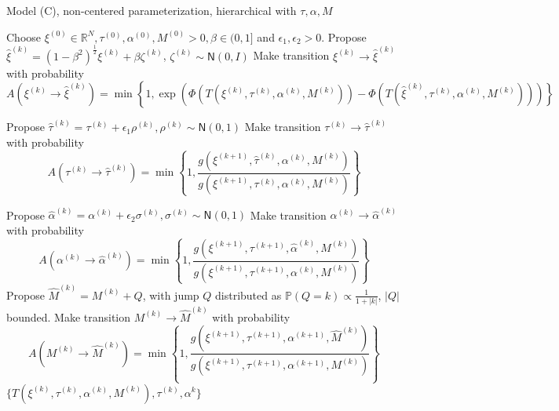 \documentclass{siamart1116}
\begin{document}
        \begin{algorithm}
            \caption{Model (C), non-centered parameterization, hierarchical with $\tau, \alpha, M$}
            \label{alg:hier_t_a_M}
            \begin{algorithmic}[1]
            \State Choose $\xi^{(0)} \in \mathbb{R}^N, \tau^{(0)}, \alpha^{(0)}, M^{(0)} > 0, \beta \in (0, 1]$ and $\epsilon_1, \epsilon_2 > 0$.
            \State Propose $\hat\xi^{(k)} = (1-\beta^2)^{\frac{1}{2}}\xi^{(k)} + \beta \zeta^{(k)}$, $\zeta^{(k)} \sim \mathsf{N}(0, I)$
            \State Make transition $\xi^{(k)} \to \hat\xi^{(k)}$ with probability
            \[ A(\xi^{(k)} \to \hat\xi^{(k)}) = \min\left\{1, \exp\left(\Phi(T(\xi^{(k)},\tau^{(k)},\alpha^{(k)}, M^{(k)})) - \Phi(T(\hat\xi^{(k)},\tau^{(k)},\alpha^{(k)}, M^{(k)}))\right) \right\}\] 

            \State Propose $\hat\tau^{(k)} = \tau^{(k)} + \epsilon_1 \rho^{(k)}, \rho^{(k)} \sim \mathsf{N}(0,1)$
            \State Make transition $\tau^{(k)} \to \hat\tau^{(k)}$ with probability
            \[ A(\tau^{(k)} \to \hat\tau^{(k)}) 
            = \min\left\{1, \frac{g(\xi^{(k+1)},\hat\tau^{(k)},\alpha^{(k)},M^{(k)})}{g(\xi^{(k+1)},\tau^{(k)},\alpha^{(k)},M^{(k)})} \right\}\] 

            \State Propose $\hat\alpha^{(k)} = \alpha^{(k)} + \epsilon_2 \sigma^{(k)}, \sigma^{(k)} \sim \mathsf{N}(0,1)$
            \State Make transition $\alpha^{(k)} \to \hat\alpha^{(k)}$ with probability
            \[ A(\alpha^{(k)} \to \hat\alpha^{(k)}) 
            = \min\left\{1, \frac{g(\xi^{(k+1)},\tau^{(k+1)},\hat \alpha^{(k)},M^{(k)})}{g(\xi^{(k+1)},\tau^{(k+1)},\alpha^{(k)},M^{(k)})} \right\}\]
            \State Propose $\hat M^{(k)} = M^{(k)} + Q$, with jump $Q$ distributed as $\mathbb{P}(Q=k) \propto \frac{1}{1+|k|}$, $|Q|$ bounded.
            \State Make transition $M^{(k)} \to \hat M^{(k)}$ with probability
            \[ A(M^{(k)} \to \hat M^{(k)}) = 
            \min\left\{1, \frac{g(\xi^{(k+1)},\tau^{(k+1)},\alpha^{(k+1)},\hat M^{(k)})}{g(\xi^{(k+1)},\tau^{(k+1)},\alpha^{(k+1)},M^{(k)})} \right\}
            \]
            \EndFor
            \State \Return $\{ T(\xi^{(k)},\tau^{(k)},\alpha^{(k)}, M^{(k)}), \tau^{(k)}, \alpha^{k} \}$
            \end{algorithmic}
        \end{algorithm}
\end{document}

